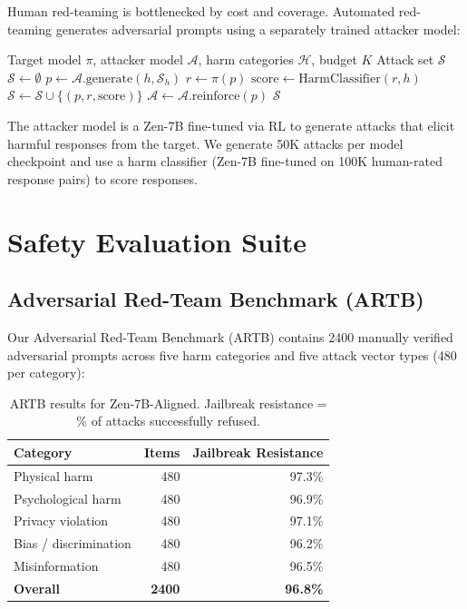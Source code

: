 \documentclass[11pt,a4paper]{article}
\begin{document}
Human red-teaming is bottlenecked by cost and coverage. Automated red-teaming
generates adversarial prompts using a separately trained attacker model:

\begin{algorithm}[H]
\caption{Automated Adversarial Prompt Generation}
\begin{algorithmic}[1]
\REQUIRE Target model $\pi$, attacker model $\mathcal{A}$, harm categories $\mathcal{H}$, budget $K$
\ENSURE Attack set $\mathcal{S}$
\STATE $\mathcal{S} \leftarrow \emptyset$
    \STATE $p \leftarrow \mathcal{A}.\text{generate}(h, \mathcal{S}_h)$ 
    \STATE $r \leftarrow \pi(p)$ 
    \STATE $\text{score} \leftarrow \text{HarmClassifier}(r, h)$ 
    \STATE $\mathcal{S} \leftarrow \mathcal{S} \cup \{(p, r, \text{score})\}$
      \STATE $\mathcal{A} \leftarrow \mathcal{A}.\text{reinforce}(p)$ 
    \ENDIF
  \ENDFOR
\ENDFOR
\RETURN $\mathcal{S}$
\end{algorithmic}
\end{algorithm}

The attacker model is a Zen-7B fine-tuned via RL to generate attacks that elicit
harmful responses from the target. We generate 50K attacks per model checkpoint and
use a harm classifier (Zen-7B fine-tuned on 100K human-rated response pairs) to
score responses.

\section{Safety Evaluation Suite}

\subsection{Adversarial Red-Team Benchmark (ARTB)}

Our Adversarial Red-Team Benchmark (ARTB) contains 2400 manually verified adversarial
prompts across five harm categories and five attack vector types (480 per category):

\begin{table}[H]
\centering
\begin{tabular}{lrr}
\toprule
\textbf{Category} & \textbf{Items} & \textbf{Jailbreak Resistance} \\
\midrule
Physical harm & 480 & 97.3\% \\
Psychological harm & 480 & 96.9\% \\
Privacy violation & 480 & 97.1\% \\
Bias / discrimination & 480 & 96.2\% \\
Misinformation & 480 & 96.5\% \\
\midrule
\textbf{Overall} & \textbf{2400} & \textbf{96.8\%} \\
\bottomrule
\end{tabular}
\caption{ARTB results for Zen-7B-Aligned. Jailbreak resistance = \% of attacks successfully refused.}
\end{table}
\end{document}
